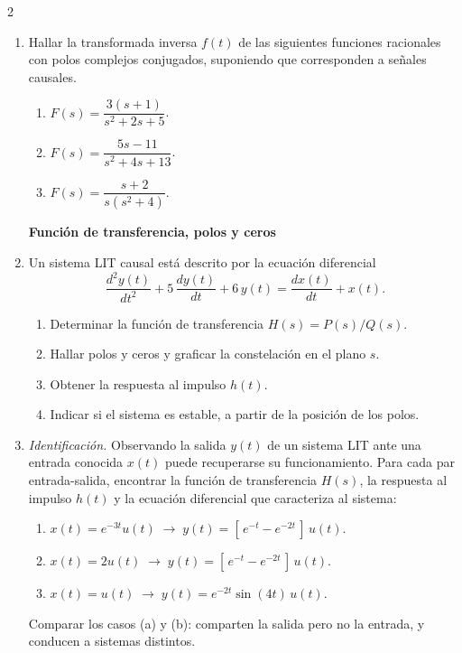 \documentclass[10pt,a4paper]{article}
\begin{document}
\begin{multicols}{2}
\begin{enumerate}
			\item Hallar la transformada inversa $f(t)$ de las siguientes funciones racionales con polos complejos conjugados, suponiendo que corresponden a señales causales.
			\begin{enumerate}
				\item $F(s) = \dfrac{3(s+1)}{s^2+2s+5}$.
				\item $F(s) = \dfrac{5s-11}{s^2+4s+13}$.
				\item $F(s) = \dfrac{s+2}{s(s^2+4)}$.
			\end{enumerate}

			\textbf{Función de transferencia, polos y ceros}
			\item Un sistema LIT causal está descrito por la ecuación diferencial
			\[
				\frac{d^2 y(t)}{dt^2} + 5\,\frac{d y(t)}{dt} + 6\,y(t) = \frac{d x(t)}{dt} + x(t).
			\]
			\begin{enumerate}
				\item Determinar la función de transferencia $H(s) = P(s)/Q(s)$.
				\item Hallar polos y ceros y graficar la constelación en el plano $s$.
				\item Obtener la respuesta al impulso $h(t)$.
				\item Indicar si el sistema es estable, a partir de la posición de los polos.
			\end{enumerate}

			\item \emph{Identificación.} Observando la salida $y(t)$ de un sistema LIT ante una entrada conocida $x(t)$ puede recuperarse su funcionamiento. Para cada par entrada-salida, encontrar la función de transferencia $H(s)$, la respuesta al impulso $h(t)$ y la ecuación diferencial que caracteriza al sistema:
			\begin{enumerate}
				\item $x(t) = e^{-3t}u(t) \;\rightarrow\; y(t) = [\,e^{-t} - e^{-2t}\,]\,u(t)$.
				\item $x(t) = 2u(t) \;\rightarrow\; y(t) = [\,e^{-t} - e^{-2t}\,]\,u(t)$.
				\item $x(t) = u(t) \;\rightarrow\; y(t) = e^{-2t}\sin(4t)\,u(t)$.
			\end{enumerate}
			Comparar los casos (a) y (b): comparten la salida pero no la entrada, y conducen a sistemas distintos.


\end{enumerate}
\end{multicols}
\end{document}
